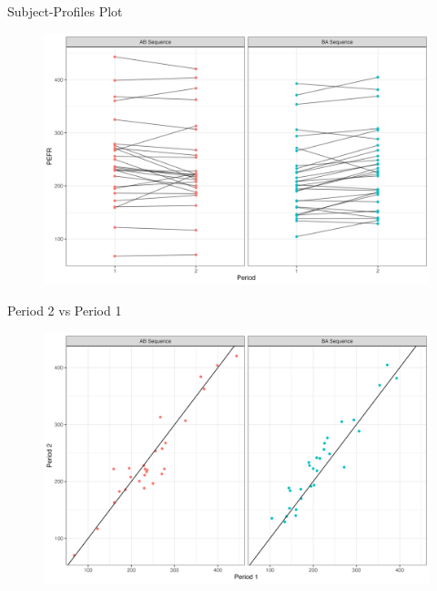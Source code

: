 \documentclass{beamer}
\begin{document}
\begin{frame}{Subject-Profiles Plot}
    \begin{figure}
        \centering
        \includegraphics[width=\linewidth]{report/figures/ch2/subjectProfilesPlot.png}
    \end{figure}
\end{frame}

\begin{frame}{Period 2 vs Period 1}
    \begin{figure}
        \centering
        \includegraphics[width=\linewidth]{report/figures/ch2/periodsPlot.png}
    \end{figure}
\end{frame}
\end{document}
